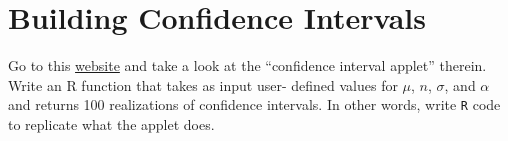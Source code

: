 \documentclass[12pt,letterpaper]{article}
\begin{document}
\section{Building Confidence Intervals}

Go to this \href{www.stat.wvu.edu/SRS/Modules/CI/cholesterol.html}{website} and take a look at the “confidence interval applet” therein. Write an R function that takes as input user- defined values for $\mu$, $n$, $\sigma$, and $\alpha$ and returns 100 realizations of confidence intervals. In other words, write \texttt{R} code to replicate what the applet does.
\end{document}
